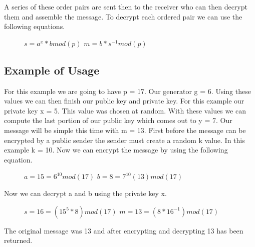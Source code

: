 \documentclass[conference]{IEEEtran}
\begin{document}
A series of these order pairs are sent then to the receiver who can then decrypt them and assemble the message. To decrypt each ordered pair we can use the following equations.

\begin{figure}[H]
	\begin{center}
		$s={a}^{x} * b mod\left(p\right)$ \newline
		$m=b * {s}^{-1} mod\left(p\right)$ \newline
	\end{center}
\end{figure}


\subsection{Example of Usage}
For this example we are going to have p = 17. Our generator g = 6. Using these values we can then finish our public key and private key. For this example our private key x = 5. This value was chosen at random. With these values we can compute the last portion of our public key which comes out to y = 7. Our message will be simple this time with m = 13. First before the message can be encrypted by a public sender the sender must create a random k value. In this example k = 10. Now we can encrypt the message by using the following equation. \newline

\begin{figure}[h]
	\begin{center}
		$a= 15 ={6}^{10}mod\left(17\right)$ \newline
		$b= 8  ={7}^{10}\left(13\right)mod\left(17\right)$ \newline
	\end{center}
\end{figure}

Now we can decrypt a and b using the private key x. 

\begin{figure}[H]
	\begin{center}
		$s = 16 = \left( {15}^{5} * 8 \right) mod\left(17\right)$ \newline
		$m= 13 = \left(8 * {16}^{-1} \right) mod\left(17\right)$ \newline
	\end{center}
\end{figure}

The original message was 13 and after encrypting and decrypting 13 has been returned.
\end{document}
